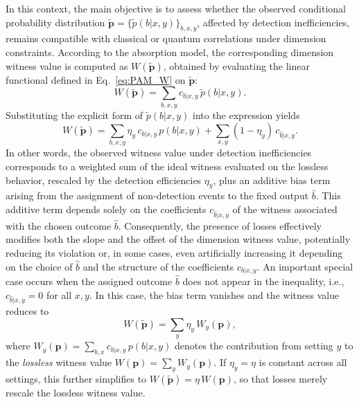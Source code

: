 \documentclass[aps,pra,reprint, superscriptaddress,showkeys]{revtex4-2}
\theoremstyle{plain}
\begin{document}
In this context, the main objective is to assess whether the observed conditional probability distribution \(\mathbf{\tilde{p}} = \{\tilde{p}(b|x,y)\}_{b,x,y}\), affected by detection inefficiencies, remains compatible with classical or quantum correlations under dimension constraints. According to the absorption model, the corresponding dimension witness value is computed as \( W(\mathbf{\tilde{p}}) \), obtained by evaluating the linear functional defined in Eq.~\eqref{eq:PAM_W} on \(\mathbf{\tilde{p}}\):
\begin{equation}
    W(\mathbf{\tilde{p}}) = \sum_{b,x,y}  c_{b|x,y}\, \tilde{p}(b|x,y).
    \label{eq:pam_tildeW}
\end{equation}
Substituting the explicit form of \(\tilde{p}(b|x,y)\) into the expression yields
\begin{equation}
    W(\mathbf{\tilde{p}}) = \sum_{b,x,y} \eta_y\, c_{b|x,y}\, p(b|x,y) + \sum_{x,y} (1 - \eta_y)\, c_{\hat b|x,y}.
\end{equation}
In other words, the observed witness value under detection inefficiencies corresponds to a weighted sum of the ideal witness evaluated on the lossless behavior, rescaled by the detection efficiencies \(\eta_y\), plus an additive bias term arising from the assignment of non-detection events to the fixed output \(\hat b\). This additive term depends solely on the coefficients \(c_{\hat{b}|x,y}\) of the witness associated with the chosen outcome \(\hat b\). Consequently, the presence of losses effectively modifies both the slope and the offset of the dimension witness value, potentially reducing its violation or, in some cases, even artificially increasing it depending on the choice of \(\hat b\) and the structure of the coefficients \(c_{b|x,y}\). An important special case occurs when the assigned outcome $\hat b$ does not appear in the inequality, i.e., $c_{\hat b|x,y} = 0$ for all $x,y$. In this case, the bias term vanishes and the witness value reduces to
\begin{equation}
W(\mathbf{\tilde{p}}) = \sum_{y} \eta_y\, W_y(\mathbf{p}),
\end{equation}
where $W_y(\mathbf{p}) = \sum_{b,x} c_{b|x,y}\, p(b|x,y)$ denotes the contribution from setting $y$ to the \emph{lossless} witness value $W(\mathbf{p}) = \sum_{y} W_y(\mathbf{p})$. If $\eta_y = \eta$ is constant across all settings, this further simplifies to $W(\mathbf{\tilde{p}}) = \eta\, W(\mathbf{p})$, so that losses merely rescale the lossless witness value.
\end{document}
